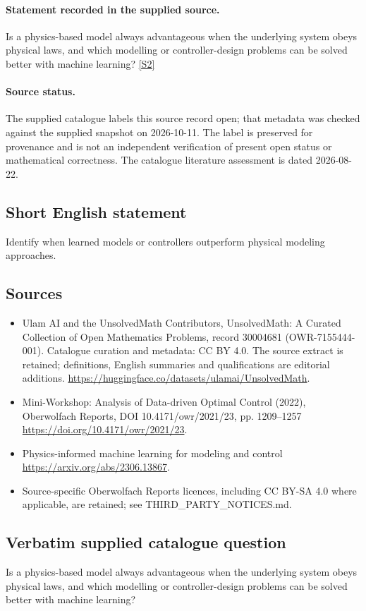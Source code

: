 \documentclass[11pt]{article}
\begin{document}
\paragraph{Statement recorded in the supplied source.}
Is a physics-based model always advantageous when the underlying system obeys physical laws, and which modelling or controller-design problems can be solved better with machine learning? \href{https://doi.org/10.4171/owr/2021/23}{[S2]}
\paragraph{Source status.}
The supplied catalogue labels this source record open; that metadata was checked against the supplied snapshot on 2026-10-11. The label is preserved for provenance and is not an independent verification of present open status or mathematical correctness. The catalogue literature assessment is dated 2026-08-22.
\subsection{Short English statement}
Identify when learned models or controllers outperform physical modeling approaches.
\subsection{Sources}
\begin{itemize}
\item[S1] Ulam AI and the UnsolvedMath Contributors, UnsolvedMath: A Curated Collection of Open Mathematics Problems, record 30004681 (OWR-7155444-001). Catalogue curation and metadata: CC BY 4.0. The source extract is retained; definitions, English summaries and qualifications are editorial additions.
\url{https://huggingface.co/datasets/ulamai/UnsolvedMath}.
\item[S2] Mini-Workshop: Analysis of Data-driven Optimal Control (2022), Oberwolfach Reports, DOI 10.4171/owr/2021/23, pp. 1209--1257
\url{https://doi.org/10.4171/owr/2021/23}.
\item[S3] Physics-informed machine learning for modeling and control
\url{https://arxiv.org/abs/2306.13867}.
\item Source-specific Oberwolfach Reports licences, including CC BY-SA 4.0 where applicable, are retained; see THIRD\_PARTY\_NOTICES.md.
\end{itemize}
\subsection{Verbatim supplied catalogue question}
Is a physics-based model always advantageous when the underlying system obeys physical laws, and which modelling or controller-design problems can be solved better with machine learning?
\end{document}
